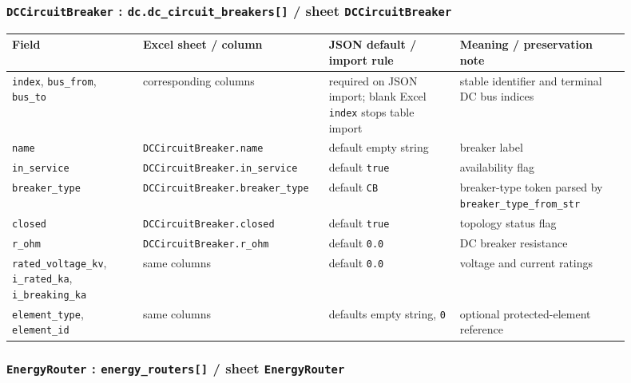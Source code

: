 \subsubsection*{\texttt{DCCircuitBreaker} : \texttt{dc.dc\_circuit\_breakers[]} / sheet \texttt{DCCircuitBreaker}}

\begin{longtable}{L{0.20\linewidth}L{0.24\linewidth}L{0.20\linewidth}L{0.26\linewidth}}
\toprule
Field & Excel sheet / column & JSON default / import rule & Meaning / preservation note \\
\midrule
\endhead
\texttt{index}, \texttt{bus\_from}, \texttt{bus\_to} & corresponding columns & required on JSON import; blank Excel \texttt{index} stops table import & stable identifier and terminal DC bus indices \\
\texttt{name} & \texttt{DCCircuitBreaker.name} & default empty string & breaker label \\
\texttt{in\_service} & \texttt{DCCircuitBreaker.in\_service} & default \texttt{true} & availability flag \\
\texttt{breaker\_type} & \texttt{DCCircuitBreaker.breaker\_type} & default \texttt{CB} & breaker-type token parsed by \texttt{breaker\_type\_from\_str} \\
\texttt{closed} & \texttt{DCCircuitBreaker.closed} & default \texttt{true} & topology status flag \\
\texttt{r\_ohm} & \texttt{DCCircuitBreaker.r\_ohm} & default \texttt{0.0} & DC breaker resistance \\
\texttt{rated\_voltage\_kv}, \texttt{i\_rated\_ka}, \texttt{i\_breaking\_ka} & same columns & default \texttt{0.0} & voltage and current ratings \\
\texttt{element\_type}, \texttt{element\_id} & same columns & defaults empty string, \texttt{0} & optional protected-element reference \\
\bottomrule
\end{longtable}

\subsubsection*{\texttt{EnergyRouter} : \texttt{energy\_routers[]} / sheet \texttt{EnergyRouter}}

